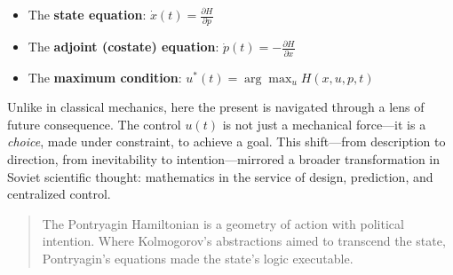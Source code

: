 \begin{itemize}
  \item The \textbf{state equation}: \( \dot{x}(t) = \frac{\partial H}{\partial p} \)
  \item The \textbf{adjoint (costate) equation}: \( \dot{p}(t) = -\frac{\partial H}{\partial x} \)
  \item The \textbf{maximum condition}: \( u^*(t) = \arg\max_u H(x, u, p, t) \)
\end{itemize}

Unlike in classical mechanics, here the present is navigated through a lens of future consequence. The control \( u(t) \) is not just a mechanical force—it is a \emph{choice}, made under constraint, to achieve a goal. This shift—from description to direction, from inevitability to intention—mirrored a broader transformation in Soviet scientific thought: mathematics in the service of design, prediction, and centralized control.

\begin{quote}
The Pontryagin Hamiltonian is a geometry of action with political intention. Where Kolmogorov’s abstractions aimed to transcend the state, Pontryagin’s equations made the state's logic executable.
\end{quote}

